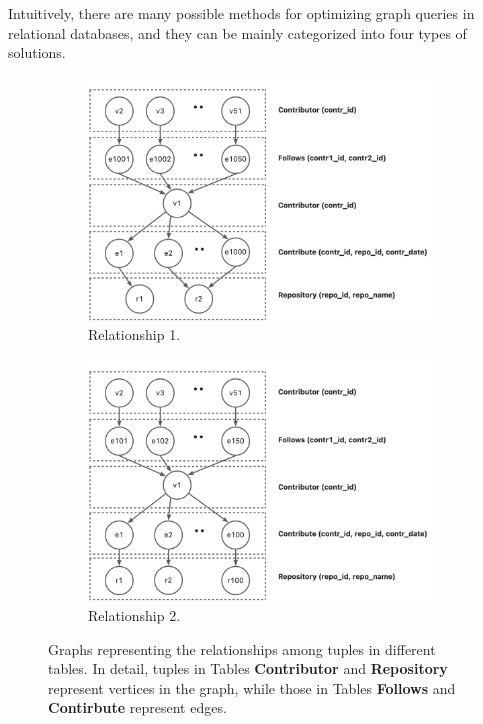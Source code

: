 Intuitively, there are many possible methods for optimizing graph queries in relational databases, and they can be mainly categorized into four types of solutions.

\begin{figure}
    \centering
    \begin{subfigure}[b]{0.4\linewidth}
        \centering
        \includegraphics[width=\linewidth]{./figures/intro-order-case.png}
        \caption{Relationship 1.}
        \label{fig:intro-order-case}
    \end{subfigure}
    \begin{subfigure}[b]{0.4\linewidth}
        \centering
        \includegraphics[width=\linewidth]{./figures/intro-order-case-2.png}
        \caption{Relationship 2.}
        \label{fig:intro-order-case2}
    \end{subfigure}
    \caption{Graphs representing the relationships among tuples in different tables. In detail, tuples in Tables \textbf{Contributor} and \textbf{Repository} represent vertices in the graph, while those in Tables \textbf{Follows} and \textbf{Contirbute} represent edges.}
    \label{fig:intro-replace-example}
\end{figure}

